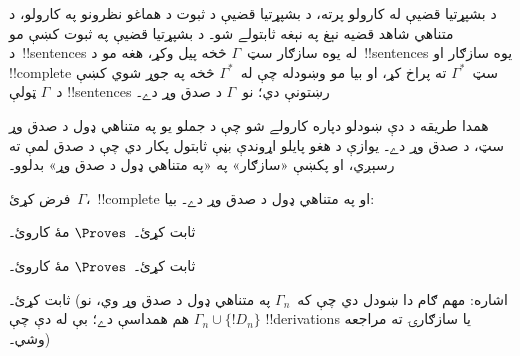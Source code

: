 \documentclass[../../../include/open-logic-section]{subfiles}
\begin{document}
      {}
      {}


د بشپړتيا قضيې له کارولو پرته، د بشپړتيا قضيې د ثبوت د هماغو
نظرونو په کارولو، د متناهي شاهد قضيه نېغ په نېغه ثابتولے شو۔ د
بشپړتيا قضيې په ثبوت کښې مو د~!!{sentence}s له يوه سازګار
سټ~$\Gamma$ څخه پيل وکړ، هغه مو د~!!{sentence}s يوه
سازګار او !!{complete} سټ~$\Gamma^*$ ته
پراخ کړ، او بيا مو وښودله چې له~$\Gamma^*$ څخه په جوړ شوي
کښې د~$\Gamma$ ټولې !!{sentence}s رښتونې دي؛ نو~$\Gamma$ د صدق وړ دے۔

همدا طريقه د دې ښودلو دپاره کارولے شو چې د جملو يو په متناهي ډول
د صدق وړ سټ، د صدق وړ دے۔ يوازې د هغو پايلو اړوندې بڼې ثابتول
پکار دي چې د صدق لمې ته رسېږي، او پکښې «سازګار» په «په متناهي
ډول د صدق وړ» بدلوو۔

\begin{prop}
فرض کړئ~$\Gamma$،~!!{complete} او په متناهي ډول د صدق وړ دے۔ بيا:
\begin{enumerate}


\end{enumerate}
\end{prop}

\begin{prob}
 ثابت کړئ۔~$\Proves$ مۀ کاروئ۔
\end{prob}
\tagendprob

\begin{prob}
 ثابت کړئ۔~$\Proves$ مۀ کاروئ۔
\end{prob}
\tagendprob


\begin{prob}
 ثابت کړئ۔ (اشاره: مهم ګام
دا ښودل دي چې که~$\Gamma_n$ په متناهي ډول د صدق وړ وي، نو
$\Gamma_n \cup \{!D_n\}$ هم همداسې دے؛ بې له دې چې
!!{derivation}s يا سازګارۍ ته مراجعه وشي۔)
\end{prob}
\tagendprob
\end{document}
